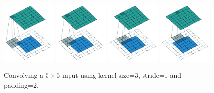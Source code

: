 \documentclass{article}
\begin{document}
\begin{figure}[H]
    \centering
    \includegraphics[width=0.24\textwidth]{pdf/full_padding_no_strides_00.pdf}
    \includegraphics[width=0.24\textwidth]{pdf/full_padding_no_strides_01.pdf}
    \includegraphics[width=0.24\textwidth]{pdf/full_padding_no_strides_02.pdf}
    \includegraphics[width=0.24\textwidth]{pdf/full_padding_no_strides_03.pdf}
    \caption{\label{fig:full_padding_no_strides}
        Convolving a $5 \times 5$ input using kernel size=3, stride=1 and padding=2.}
\end{figure}
\end{document}
